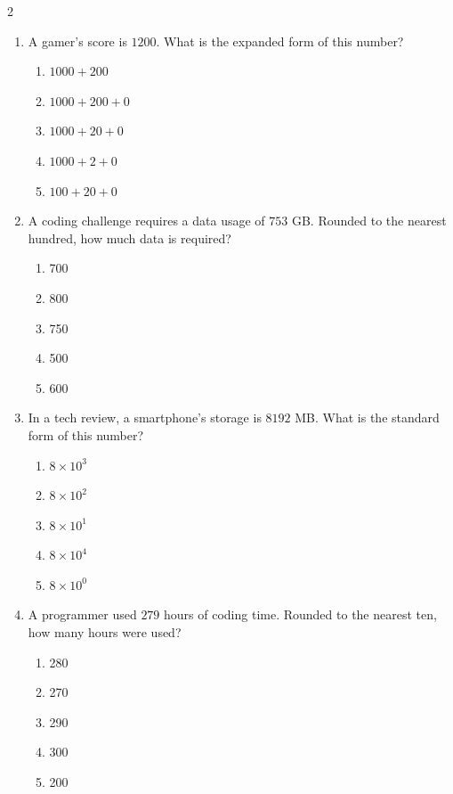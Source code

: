 \documentclass[10pt]{article}
\begin{document}
\begin{multicols}{2}
\begin{enumerate}[label=\textbf{Q\arabic*.}, leftmargin=*, itemsep=6pt, parsep=0pt]
  \item \small A gamer's score is $1200$. What is the expanded form of this number?
  \begin{enumerate}[label=(\Alph*), leftmargin=0.6cm, nosep, itemsep=2pt]
    \item $1000 + 200$
    \item $1000 + 200 + 0$
    \item $1000 + 20 + 0$
    \item $1000 + 2 + 0$
    \item $100 + 20 + 0$
  \end{enumerate}

  \item \small A coding challenge requires a data usage of $753$ GB. Rounded to the nearest hundred, how much data is required?
  \begin{enumerate}[label=(\Alph*), leftmargin=0.6cm, nosep, itemsep=2pt]
    \item 700
    \item 800
    \item 750
    \item 500
    \item 600
  \end{enumerate}

  \item \small In a tech review, a smartphone's storage is $8192$ MB. What is the standard form of this number?
  \begin{enumerate}[label=(\Alph*), leftmargin=0.6cm, nosep, itemsep=2pt]
    \item $8 \times 10^3$
    \item $8 \times 10^2$
    \item $8 \times 10^1$
    \item $8 \times 10^4$
    \item $8 \times 10^0$
  \end{enumerate}

  \item \small A programmer used $279$ hours of coding time. Rounded to the nearest ten, how many hours were used?
  \begin{enumerate}[label=(\Alph*), leftmargin=0.6cm, nosep, itemsep=2pt]
    \item 280
    \item 270
    \item 290
    \item 300
    \item 200
  \end{enumerate}


\end{enumerate}
\end{multicols}
\end{document}
